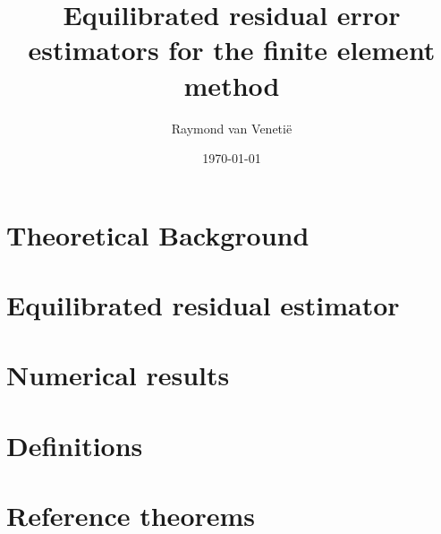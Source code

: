 \documentclass{uvamath}
\title{Equilibrated residual error estimators for the finite element method} %
\author[raymond.van.venetie@gmail.com, 10004627]{Raymond van Veneti\"e} %
\date{\today} %
\theoremstyle{plain}%
\theoremstyle{definition}
\theoremstyle{remark}
\newcommand{\1}{\mathds{1}}
\begin{document}
\maketitle
\begin{abstract}
  
\end{abstract}

\tableofcontents

%

\chapter{Theoretical Background}


\chapter{Equilibrated residual estimator}


\chapter{Numerical results}


\begin{appendices}

\chapter{Definitions}

\chapter{Reference theorems}

\end{appendices}





\end{document}
